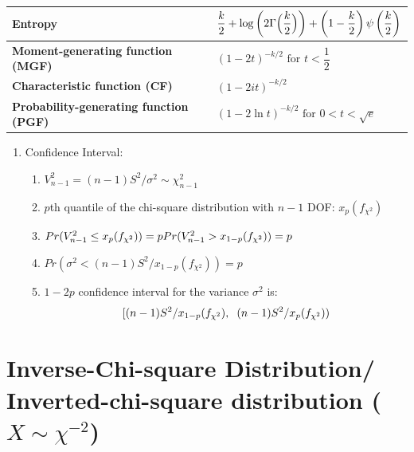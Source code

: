 \begin{longtable}{|m{6cm}|p{9cm}|}
    \textbf{Entropy} &
    ${\displaystyle {{\dfrac {k}{2}} +\log \left(2\Gamma {\Bigl (}{\dfrac {k}{2}}{\Bigr )}\right)+\left(1-{\dfrac {k}{2}}\right)\psi \left({\dfrac {k}{2}}\right)}}$
    \\[1ex] \hline

    \textbf{Moment-generating function (MGF)} &
    ${\displaystyle (1-2t)^{-k/2}{\text{ for }}t<{\dfrac {1}{2}}\;}$
    \\[1ex] \hline

    \textbf{Characteristic function (CF)} &
    ${\displaystyle (1-2it)^{-k/2}}$
    \\[1ex] \hline

    \textbf{Probability-generating function (PGF)} &
    ${\displaystyle (1-2\ln t)^{-k/2}{\text{ for }}0<t<{\sqrt {e}}\;}$
    \\[1ex] \hline

\end{longtable}
\renewcommand{\arraystretch}{1}

\begin{enumerate}[itemsep=0.2cm]
    \item Confidence Interval:
    \begin{enumerate}[itemsep=0.2cm]
        \item $V_{n-1}^2 = (n-1)S^2/\sigma^2 \sim \chi_{n-1}^2$

        \item $p$th quantile of the chi-square distribution with $n - 1$ DOF: $x_p(f_{\chi^2})$

        \item $
            \hfill
            Pr(V_{n-1}^2 \leq x_p(f_{\chi^2})) = p
            \hfill
            Pr(V_{n-1}^2 > x_{1-p}(f_{\chi^2})) = p
            \hfill
        $

        \item $
            Pr(\sigma^2 < (n-1)S^2/x_{1-p}(f_{\chi^2})) = p 
        $

        \item $1 - 2p$ confidence interval for the variance $\sigma^2$ is:
        \[[
            (n-1)S^2/x_{1-p}(f_{\chi^2}), 
            \hspace{0.2cm}
            (n-1)S^2/x_{p}(f_{\chi^2})
        )\]

    \end{enumerate}

\end{enumerate}



\section{Inverse-Chi-square Distribution/ Inverted-chi-square distribution ($X \sim \chi^{-2}$) \cite{wiki/Inverse-chi-squared_distribution}} \label{Inverse-Chi-square Distribution/ Inverted-chi-square distribution}



